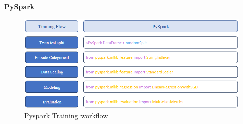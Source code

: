 \documentclass[11pt]{article}
\begin{document}
\textbf{PySpark}
\begin{figure}[H]
    \centering
    \includegraphics[width=0.7\linewidth]{pysparkFlow.png}
    \caption{Pyspark Training workflow}
\end{figure}

\printbibliography
\end{document}
